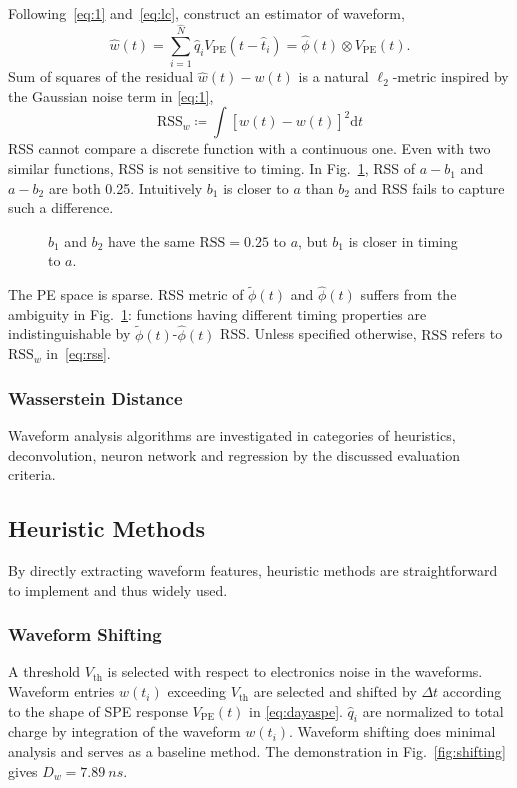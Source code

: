 Following~\eqref{eq:1} and~\eqref{eq:lc}, construct an estimator of waveform,
\begin{equation}
  \label{eq:w-hat}
  \hat{w}(t) = \sum_{i=1}^{\hat{N}}\hat{q}_iV_\mathrm{PE}(t-\hat{t}_i) = \hat{\phi}(t) \otimes V_\mathrm{PE}(t).
\end{equation}
Sum of squares of the residual $\hat{w}(t) - w(t)$ is a natural $\ell_2$-metric inspired by the Gaussian noise term in \eqref{eq:1},
\begin{equation}
  \label{eq:rss}
  \mathrm{RSS}_w\coloneqq\int\left[\hat{w}(t) - w(t)\right]^2\mathrm{d}t
\end{equation}
RSS cannot compare a discrete function with a continuous one.  Even with two similar functions, RSS is not sensitive to timing.  In Fig.~\ref{fig:l2}, RSS of  $a-b_{1}$ and $a-b_{2}$ are both 0.25.  Intuitively $b_1$ is closer to $a$ than $b_2$ and RSS fails to capture such a difference.
\begin{figure}[H]
  \centering
  \scalebox{0.4}{}
  \caption{\label{fig:l2} $b_1$ and $b_2$ have the same $\mathrm{RSS}=0.25$ to $a$, but $b_1$ is closer in timing to $a$.}
\end{figure}

The PE space is sparse. RSS metric of $\tilde{\phi}(t)$ and $\hat{\phi}(t)$ suffers from the ambiguity in Fig.~\ref{fig:l2}: functions having different timing properties are indistinguishable by $\tilde{\phi}(t)$-$\hat{\phi}(t)$ RSS.  Unless specified otherwise, $\mathrm{RSS}$ refers to $\mathrm{RSS}_w$ in~\eqref{eq:rss}.

\subsubsection{Wasserstein Distance}
\label{sec:W-dist}



Waveform analysis algorithms are investigated in categories of heuristics, deconvolution, neuron network and regression by the discussed evaluation criteria.

\subsection{Heuristic Methods}
By directly extracting waveform features, heuristic methods are straightforward to implement and thus widely used. 

\subsubsection{Waveform Shifting}
\label{sec:shifting}
A threshold $V_\mathrm{th}$ is selected with respect to electronics noise in the waveforms. Waveform entries $w(t_i)$ exceeding $V_\mathrm{th}$ are selected and shifted by $\Delta t$ according to the shape of SPE response $V_\mathrm{PE}(t)$ in \eqref{eq:dayaspe}. $\hat{q}_i$ are normalized to total charge by integration of the waveform $w(t_i)$.  Waveform shifting does minimal analysis and serves as a baseline method.  The demonstration in Fig.~\ref{fig:shifting} gives $D_w = \SI{7.89}{ns}$.

